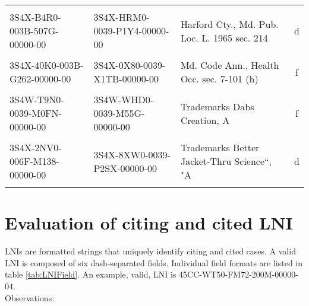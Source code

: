 \documentclass[10pt, letterpaper]{article}
\begin{document}
\begin{spacing}{1.0}
\begin{table}[H]
\begin{adjustwidth}{-0.225in}{}
\begin{tabular}{llp{2in}c}
            & & &\\[-6pt]
            3S4X-B4R0-003B-507G-00000-00 & 3S4X-HRM0-0039-P1Y4-00000-00 & Harford Cty., Md. Pub. Loc. L. 1965 sec. 214 & d\\
            & & &\\[-6pt]
            3S4X-40K0-003B-G262-00000-00 & 3S4X-0X80-0039-X1TB-00000-00 & Md. Code Ann., Health Occ. sec. 7-101 (h) & f\\
            & & &\\[-6pt]
            3S4W-T9N0-0039-M0FN-00000-00 & 3S4W-WHD0-0039-M55G-00000-00 & Trademarks Dabs Creation, A & f\\
            & & &\\[-6pt]
            3S4X-2NV0-006F-M138-00000-00 & 3S4X-8XW0-0039-P2SX-00000-00 & Trademarks Better Jacket-Thru Science``, "A & d\\[4pt]
            \hline\\[-6pt]
        \end{tabular}
        \label{tab:exCitationInValid}
    \end{adjustwidth}
\end{table}


\clearpage

\section{Evaluation of citing and cited LNI}

LNIs are formatted strings that uniquely identify citing and cited cases.  A valid LNI is composed of six dash-separated fields.  Individual field formats are listed in table \ref{tab:LNIField}.  An example, valid, LNI is 45CC-WT50-FM72-200M-00000-04.\\

Observations:


\end{spacing}
\end{document}
